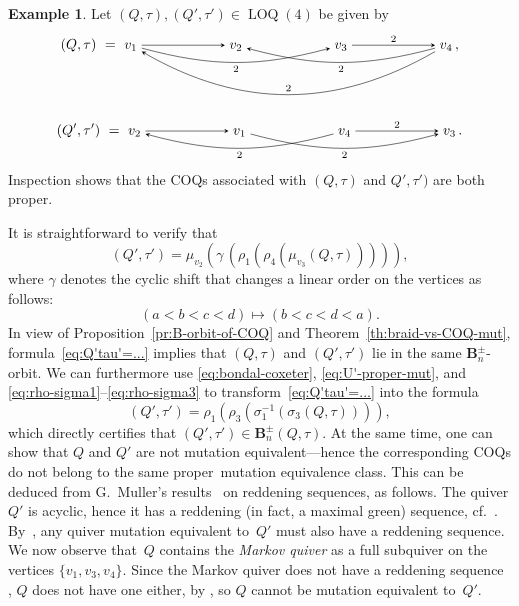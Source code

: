 \documentclass[11pt, letterpaper]{amsart}
\theoremstyle{definition}
\newtheorem{example}[theorem]{Example}
\numberwithin{equation}{section}
\newcommand\LOQ{\operatorname{LOQ}}
\begin{document}
\begin{example}
\label{eg:proper-COQs-congr-but-mut-inequiv}
Let $(Q,\tau),(Q',\tau')\in\LOQ(4)$ be given by
\vspace{2pt}
\begin{equation}
(Q,\tau)\ =\  \begin{tikzcd}[arrows={-stealth}, sep=small, cramped, sep=60]
v_1 \ar[r] \ar[rr, swap, bend right=15, "2"]  &    
v_2    &    
v_3  \ar[r, "2"]&    
v_4 \ar[lll, swap, bend left=30, "2"] \ar[ll, bend left=15, "2"] 
\end{tikzcd}\,, 
\vspace{-15pt}
\end{equation}
\begin{equation}
(Q',\tau')\ =\  \begin{tikzcd}[arrows={-stealth}, sep=small, cramped, sep=60]
v_2 \ar[r]  &    
v_1  \ar[rr, swap, bend right=15, "2"]   &    
v_4 \ar[ll, bend left=15, "2"]  \ar[r, "2"]&    
v_3  
\end{tikzcd}\,.
\end{equation}
Inspection shows that the COQs associated with $(Q,\tau)$ and $Q',\tau')$ are both proper. 

It is straightforward to verify that
\begin{equation}
\label{eq:Q'tau'=...}
(Q',\tau')=\mu_{v_2}(\gamma\,(\rho_1(\rho_4(\mu_{v_3}(Q,\tau))))), 
\end{equation}
where $\gamma$ denotes the cyclic shift that changes a linear order on the vertices as follows:
\begin{equation*}
(a<b<c<d) \mapsto (b<c<d<a). 
\end{equation*}
In view of Proposition~\ref{pr:B-orbit-of-COQ} and Theorem~\ref{th:braid-vs-COQ-mut}, 
formula~\eqref{eq:Q'tau'=...} implies that
$(Q,\tau)$ and $(Q',\tau')$ lie in the same $\mathbf{B}_n^\pm$-orbit. 
We can furthermore use \eqref{eq:bondal-coxeter}, \eqref{eq:U'-proper-mut}, and \eqref{eq:rho-sigma1}--\eqref{eq:rho-sigma3} to transform~\eqref{eq:Q'tau'=...} into the formula 
\begin{equation}
\label{eq:rho1rho3...}
(Q',\tau')=\rho_1(\rho_3(\sigma_1^{-1}(\sigma_3(Q,\tau)))), 
\end{equation}
which directly certifies that 
$(Q',\tau')\in\mathbf{B}_n^{\pm}(Q,\tau)$. 
%
At the same time, one can show that $Q$ and $Q'$ are not mutation equivalent---hence the corresponding COQs 
do not belong to the same proper~mutation equivalence class.
This can be deduced from G.~Muller's results~\cite{Muller} on reddening sequences, as follows. 
The quiver $Q'$ is acyclic, hence it has a reddening (in fact, a maximal green) sequence,
cf.~\cite[Lemma~2.20]{Brustle-Dupont-Perotin}. 
By~\cite[Corollary~19]{Muller}, any quiver mutation equivalent to~$Q'$ must also have a reddening sequence. 
We now observe that~$Q$ contains the \emph{Markov quiver} as a full subquiver on the vertices $\{v_1, v_3, v_4\}$.
Since the Markov quiver does not have a reddening sequence \cite[Remark~3.4]{Ladkani}, 
$Q$ does not have one either, by \cite[Theorem~17]{Muller},
so $Q$ cannot be mutation equivalent to~$Q'$. 


\end{example}
\end{document}
